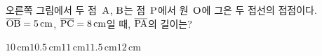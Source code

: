 \noindent\begin{minipage}[t]{0.58\linewidth}\vspace{0pt}\raggedright 오른쪽 그림에서 두 점~$\mathrm{A}$, $\mathrm{B}$는 점~$\mathrm{P}$에서 원~$\mathrm{O}$에 그은 두 접선의 접점이다. $\overline{\mathrm{OB}}=5\,\mathrm{cm}$, $\overline{\mathrm{PC}}=8\,\mathrm{cm}$일 때, $\overline{\mathrm{PA}}$의 길이는?\end{minipage}\hfill\begin{minipage}[t]{0.4\linewidth}\vspace{0pt}\centering \resizebox{\ifdim\width>\linewidth\linewidth\else\width\fi}{!}{}\end{minipage}\par
\begin{choices32}{$10\,\mathrm{cm}$}{$10.5\,\mathrm{cm}$}{$11\,\mathrm{cm}$}{$11.5\,\mathrm{cm}$}{$12\,\mathrm{cm}$}\end{choices32}
